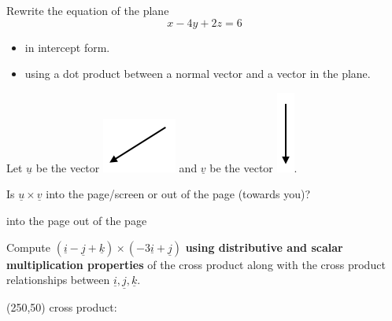 \documentclass[12pt,letterpaper,noanswers]{exam}
\newcommand{\mb}[1]{\underline{#1}}
\begin{document}
 \pdfpageheight 11in 
  \pdfpagewidth 8.5in


\begin{questions}
\item Rewrite the equation of the plane
\[x - 4y + 2z = 6 \]
\begin{itemize}
    \item in intercept form.
    \item using a dot product between a normal vector and a vector in the plane.
\end{itemize}

\vfill



\item \begin{parts}
\item Let $\mb{u}$ be the vector \includegraphics[scale=0.5]{img/C06p2b.png} and $\mb{v}$ be the vector \includegraphics[scale=0.5]{img/C06p1b.png}.

Is $\mb{u}\times\mb{v}$ into the page/screen or out of the page (towards you)?

\vspace{1in}

\begin{oneparcheckboxes}
\choice into the page
\choice out of the page
\end{oneparcheckboxes}

\item Compute $(\mb{i}-\mb{j}+\mb{k})\times(-3\mb{i}+\mb{j})$
\textbf{using distributive and scalar multiplication properties} of the cross product along with the cross product relationships between $\mb{i},\mb{j},\mb{k}$.

\framebox(250,50){ cross product:\hfill }
\vspace{1.5in}
\end{parts}


\end{questions}
\end{document}
